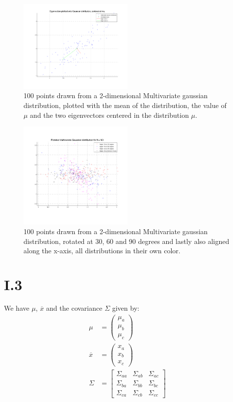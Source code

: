 \begin{figure}[h!]
	\includegraphics[width=0.5\textwidth]{img/multigausseigen}
	\caption{100 points drawn from a 2-dimensional Multivariate gaussian distribution, plotted with the
	mean of the distribution, the value of $\mu$ and the two eigenvectors centered in the distribution $\mu$. \label{fig:I.2.4.1}}
\end{figure}

\begin{figure}[h!]
	\includegraphics[width=0.5\textwidth]{img/multigaussrotate}
	\caption{100 points drawn from a 2-dimensional Multivariate gaussian distribution, rotated at 30, 60 and 90 degrees
	and lastly also aligned along the x-axis, all distributions in their own color. \label{fig:I.2.4.1.rot}}
\end{figure}

\section*{I.3}
We have $\mu$, $\overline{x}$ and the covariance $\Sigma$ given by:
\begin{align}
	\mu &= \begin{pmatrix}
		\mu_a \\
		\mu_b \\
		\mu_c
	\end{pmatrix} \\
	\overline{x} &= \begin{pmatrix}
		x_a \\
		x_b \\
		x_c
	\end{pmatrix} \\
	\Sigma &= \begin{bmatrix}
		\Sigma_{aa} & \Sigma_{ab} & \Sigma_{ac} \\
		\Sigma_{ba} & \Sigma_{bb} & \Sigma_{bc} \\
		\Sigma_{ca} & \Sigma_{cb} & \Sigma_{cc}
	\end{bmatrix}
\end{align}

